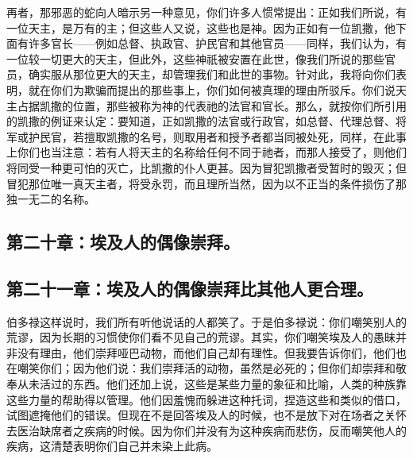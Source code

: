 再者，那邪恶的蛇向人暗示另一种意见，你们许多人惯常提出：正如我们所说，有一位天主，是万有的主；但这些人又说，这些也是神。因为正如有一位凯撒，他下面有许多官长——例如总督、执政官、护民官和其他官员——同样，我们认为，有一位较一切更大的天主，但此外，这些神祇被安置在此世，像我们所说的那些官员，确实服从那位更大的天主，却管理我们和此世的事物。针对此，我将向你们表明，就在你们为欺骗而提出的那些事上，你们如何被真理的理由所驳斥。你们说天主占据凯撒的位置，那些被称为神的代表祂的法官和官长。那么，就按你们所引用的凯撒的例证来认定：要知道，正如凯撒的法官或行政官，如总督、代理总督、将军或护民官，若擅取凯撒的名号，则取用者和授予者都当同被处死，同样，在此事上你们也当注意：若有人将天主的名称给任何不同于祂者，而那人接受了，则他们将同受一种更可怕的灭亡，比凯撒的仆人更甚。因为冒犯凯撒者受暂时的毁灭；但冒犯那位唯一真天主者，将受永罚，而且理所当然，因为以不正当的条件损伤了那独一无二的名称。\par


\subsection{第二十章：埃及人的偶像崇拜。}

\par


\subsection{第二十一章：埃及人的偶像崇拜比其他人更合理。}

伯多禄这样说时，我们所有听他说话的人都笑了。于是伯多禄说：你们嘲笑别人的荒谬，因为长期的习惯使你们看不见自己的荒谬。其实，你们嘲笑埃及人的愚昧并非没有理由，他们崇拜哑巴动物，而他们自己却有理性。但我要告诉你们，他们也在嘲笑你们；因为他们说：我们崇拜活的动物，虽然是必死的；但你们却崇拜和敬奉从未活过的东西。他们还加上说，这些是某些力量的象征和比喻，人类的种族靠这些力量的帮助得以管理。他们因羞愧而躲进这种托词，捏造这些和类似的借口，试图遮掩他们的错误。但现在不是回答埃及人的时候，也不是放下对在场者之关怀去医治缺席者之疾病的时候。因为你们并没有为这种疾病而悲伤，反而嘲笑他人的疾病，这清楚表明你们自己并未染上此病。\par

